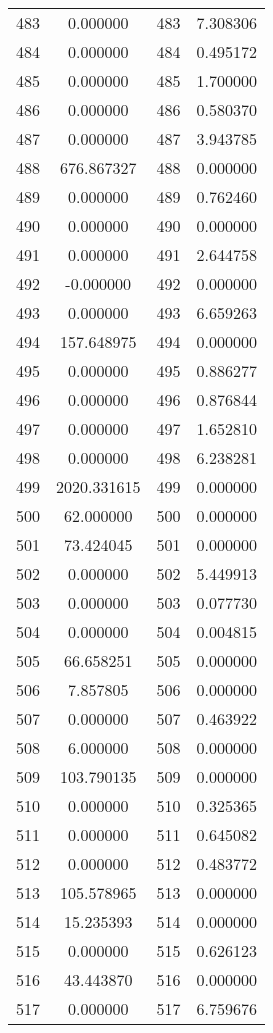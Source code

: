 \documentclass[12pt]{article}
\begin{document}
\begin{longtable}{@{}cccc@{}}
483 & 0.000000 & 483 & 7.308306 \\
484 & 0.000000 & 484 & 0.495172 \\
485 & 0.000000 & 485 & 1.700000 \\
486 & 0.000000 & 486 & 0.580370 \\
487 & 0.000000 & 487 & 3.943785 \\
488 & 676.867327 & 488 & 0.000000 \\
489 & 0.000000 & 489 & 0.762460 \\
490 & 0.000000 & 490 & 0.000000 \\
491 & 0.000000 & 491 & 2.644758 \\
492 & -0.000000 & 492 & 0.000000 \\
493 & 0.000000 & 493 & 6.659263 \\
494 & 157.648975 & 494 & 0.000000 \\
495 & 0.000000 & 495 & 0.886277 \\
496 & 0.000000 & 496 & 0.876844 \\
497 & 0.000000 & 497 & 1.652810 \\
498 & 0.000000 & 498 & 6.238281 \\
499 & 2020.331615 & 499 & 0.000000 \\
500 & 62.000000 & 500 & 0.000000 \\
501 & 73.424045 & 501 & 0.000000 \\
502 & 0.000000 & 502 & 5.449913 \\
503 & 0.000000 & 503 & 0.077730 \\
504 & 0.000000 & 504 & 0.004815 \\
505 & 66.658251 & 505 & 0.000000 \\
506 & 7.857805 & 506 & 0.000000 \\
507 & 0.000000 & 507 & 0.463922 \\
508 & 6.000000 & 508 & 0.000000 \\
509 & 103.790135 & 509 & 0.000000 \\
510 & 0.000000 & 510 & 0.325365 \\
511 & 0.000000 & 511 & 0.645082 \\
512 & 0.000000 & 512 & 0.483772 \\
513 & 105.578965 & 513 & 0.000000 \\
514 & 15.235393 & 514 & 0.000000 \\
515 & 0.000000 & 515 & 0.626123 \\
516 & 43.443870 & 516 & 0.000000 \\
517 & 0.000000 & 517 & 6.759676 \\

\end{longtable}
\end{document}
